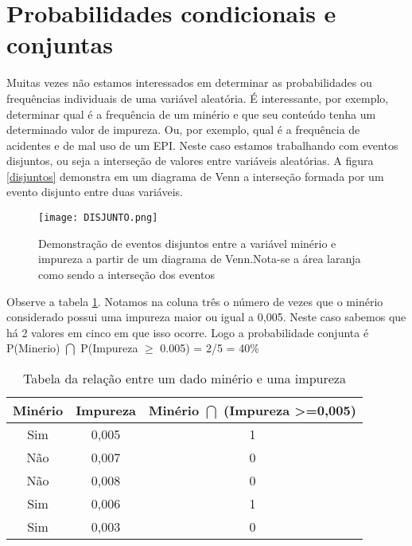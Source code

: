   
\section{Probabilidades condicionais e conjuntas}

Muitas vezes não estamos interessados em determinar as probabilidades ou frequências individuais de uma variável aleatória. É interessante, por exemplo, determinar qual é a frequência de um minério e que seu conteúdo tenha um determinado valor de impureza. Ou, por exemplo, qual é a frequência de acidentes e de mal uso de um EPI. Neste caso estamos trabalhando com eventos disjuntos, ou seja a interseção de valores entre variáveis aleatórias. A figura \eqref{disjuntos}
demonstra em um diagrama de Venn a interseção formada por um evento disjunto entre duas variáveis.

   \begin{figure}[H]
   	\centering
   	\texttt{[image: DISJUNTO.png]}	
   	\caption{Demonstração de eventos disjuntos entre a variável minério e impureza a partir de um diagrama de Venn.Nota-se a área laranja como sendo a interseção dos eventos }
   	\label{disjuntos}
   \end{figure}


 Observe a tabela \ref{tabela_impureza}. Notamos na coluna três o número de vezes que o minério considerado possui uma impureza maior ou igual a 0,005. Neste caso sabemos que há 2 valores em cinco em que isso ocorre. Logo a probabilidade conjunta é P(Minerio) $\bigcap$ P(Impureza $\geq$  0.005) = 2/5 = 40\%

\begin{table}[H]
\centering
\caption{Tabela da relação entre um dado minério e uma impureza}
\label{tabela_impureza}
\begin{tabular}{ccc}
	\toprule
	Minério & Impureza & Minério $\bigcap$ (Impureza \textgreater=0,005) \\ \midrule
	Sim     & 0,005    & 1                                                           \\
	Não     & 0,007    & 0                                                           \\
	Não     & 0,008    & 0                                                           \\
	Sim     & 0,006    & 1                                                           \\
	Sim     & 0,003    & 0                                                           \\ \bottomrule
\end{tabular}
\end{table} 

